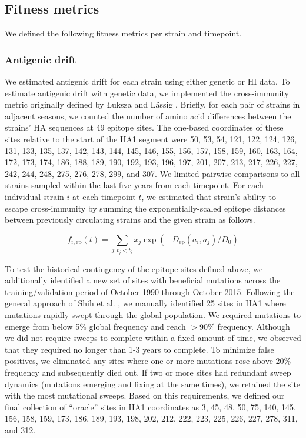 \subsection*{Fitness metrics}

We defined the following fitness metrics per strain and timepoint.

\subsubsection*{Antigenic drift}

We estimated antigenic drift for each strain using either genetic or HI data.
To estimate antigenic drift with genetic data, we implemented the cross-immunity metric originally defined by {\L}uksza and L\"assig \cite{Luksza:2014hj}.
Briefly, for each pair of strains in adjacent seasons, we counted the number of amino acid differences between the strains' HA sequences at 49 epitope sites.
The one-based coordinates of these sites relative to the start of the HA1 segment were 50, 53, 54, 121, 122, 124, 126, 131, 133, 135, 137, 142, 143, 144, 145, 146, 155, 156, 157, 158, 159, 160, 163, 164, 172, 173, 174, 186, 188, 189, 190, 192, 193, 196, 197, 201, 207, 213, 217, 226, 227, 242, 244, 248, 275, 276, 278, 299, and 307.
We limited pairwise comparisons to all strains sampled within the last five years from each timepoint.
For each individual strain $i$ at each timepoint $t$, we estimated that strain's ability to escape cross-immunity by summing the exponentially-scaled epitope distances between previously circulating strains and the given strain as follows.

\begin{equation}
    f_{i,\mathrm{ep}}(t) = \sum_{j: t_{j} < t_{i}}{x_{j}\exp{(-D_{\mathrm{ep}}(a_{i}, a_{j}) / D_{0})}}
    \label{equation_epitope_cross_immunity}
\end{equation}

To test the historical contingency of the epitope sites defined above, we additionally identified a new set of sites with beneficial mutations across the training/validation period of October 1990 through October 2015.
Following the general approach of Shih et al. \cite{Shih:2007bd}, we manually identified 25 sites in HA1 where mutations rapidly swept through the global population.
We required mutations to emerge from below 5\% global frequency and reach $>$90\% frequency.
Although we did not require sweeps to complete within a fixed amount of time, we observed that they required no longer than 1-3 years to complete.
To minimize false positives, we eliminated any sites where one or more mutations rose above 20\% frequency and subsequently died out.
If two or more sites had redundant sweep dynamics (mutations emerging and fixing at the same times), we retained the site with the most mutational sweeps.
Based on this requirements, we defined our final collection of ``oracle'' sites in HA1 coordinates as 3, 45, 48, 50, 75, 140, 145, 156, 158, 159, 173, 186, 189, 193, 198, 202, 212, 222, 223, 225, 226, 227, 278, 311, and 312.


